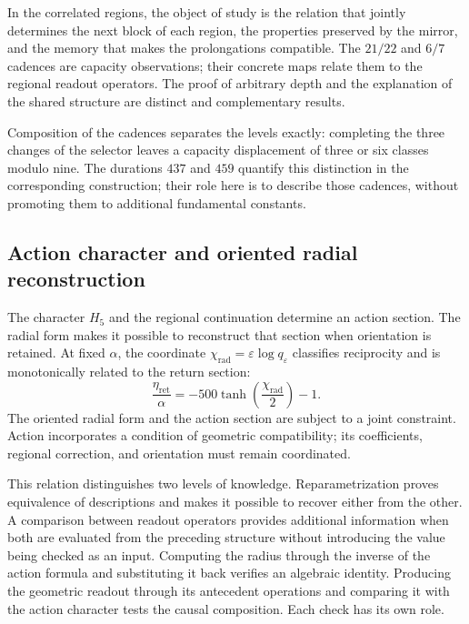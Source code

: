 In the correlated regions, the object of study is the relation
that jointly determines the next block of each region, the
properties preserved by the mirror, and the memory that makes the
prolongations compatible. The $21/22$ and $6/7$ cadences are capacity
observations; their concrete maps relate them to the regional
readout operators. The proof of arbitrary depth and the explanation of
the shared structure are distinct and
complementary results.

Composition of the cadences separates the levels exactly:
completing the three changes of the selector leaves a capacity
displacement of three or six classes modulo nine. The durations $437$
and $459$ quantify this distinction in the corresponding construction;
their role here is to describe those cadences, without promoting them to
additional fundamental constants.

\subsection{Action character and oriented radial reconstruction}
\label{md:lectin:h5}

The character $H_5$ and the regional continuation determine an action
section. The radial form makes it possible to reconstruct that section when
orientation is retained. At fixed $\alpha$, the coordinate
$\chi_{\mathrm{rad}}=\varepsilon\log q_\varepsilon$ classifies
reciprocity and is monotonically related to the return section:
\begin{equation}
 \frac{\eta_{\mathrm{ret}}}{\alpha}
 =-500\tanh\!\left(\frac{\chi_{\mathrm{rad}}}{2}\right)-1.
 \label{md:lectin:accion-radial}
\end{equation}
The oriented radial form and the action section are subject to
a joint constraint. Action incorporates a condition of
geometric compatibility; its coefficients, regional correction,
and orientation must remain coordinated.

This relation distinguishes two levels of knowledge.
Reparametrization proves equivalence of descriptions and makes it possible
to recover either from the other. A comparison between readout operators provides
additional information when both are evaluated from the preceding structure
without introducing the value being checked as an input.
Computing the radius through the inverse of the action formula
and substituting it back verifies an algebraic identity.
Producing the geometric readout through its antecedent operations
and comparing it with the action character tests the causal
composition. Each check has its own role.

